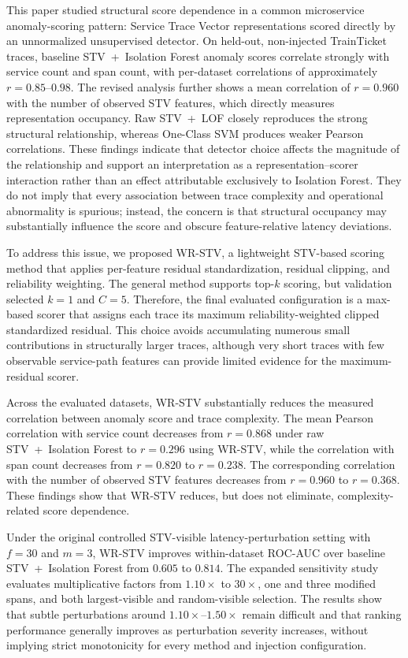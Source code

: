 \documentclass[informatics,article,submit,moreauthors]{Definitions/mdpi}
\newcommand{\rev}[1]{{\color{revisionblue}#1}}
\begin{document}
\rev{This paper studied structural score dependence in a common microservice anomaly-scoring pattern: Service Trace Vector representations scored directly by an unnormalized unsupervised detector. On held-out, non-injected TrainTicket traces, baseline STV~+~Isolation Forest anomaly scores correlate strongly with service count and span count, with per-dataset correlations of approximately \(r=0.85\)--\(0.98\). The revised analysis further shows a mean correlation of \(r=0.960\) with the number of observed STV features, which directly measures representation occupancy. Raw STV~+~LOF closely reproduces the strong structural relationship, whereas One-Class SVM produces weaker Pearson correlations. These findings indicate that detector choice affects the magnitude of the relationship and support an interpretation as a representation--scorer interaction rather than an effect attributable exclusively to Isolation Forest. They do not imply that every association between trace complexity and operational abnormality is spurious; instead, the concern is that structural occupancy may substantially influence the score and obscure feature-relative latency deviations.}

To address this issue, we proposed WR-STV, a lightweight STV-based scoring method that applies per-feature residual standardization, residual clipping, and reliability weighting. \rev{The general method supports top-\(k\) scoring, but validation selected \(k=1\) and \(C=5\). Therefore, the final evaluated configuration is a max-based scorer that assigns each trace its maximum reliability-weighted clipped standardized residual. This choice avoids accumulating numerous small contributions in structurally larger traces, although very short traces with few observable service-path features can provide limited evidence for the maximum-residual scorer.}

\rev{Across the evaluated datasets, WR-STV substantially reduces the measured correlation between anomaly score and trace complexity. The mean Pearson correlation with service count decreases from \(r=0.868\) under raw STV~+~Isolation Forest to \(r=0.296\) using WR-STV, while the correlation with span count decreases from \(r=0.820\) to \(r=0.238\). The corresponding correlation with the number of observed STV features decreases from \(r=0.960\) to \(r=0.368\). These findings show that WR-STV reduces, but does not eliminate, complexity-related score dependence.}

\rev{Under the original controlled STV-visible latency-perturbation setting with \(f=30\) and \(m=3\), WR-STV improves within-dataset ROC-AUC over baseline STV~+~Isolation Forest from \(0.605\) to \(0.814\). The expanded sensitivity study evaluates multiplicative factors from \(1.10\times\) to \(30\times\), one and three modified spans, and both largest-visible and random-visible selection. The results show that subtle perturbations around \(1.10\times\)--\(1.50\times\) remain difficult and that ranking performance generally improves as perturbation severity increases, without implying strict monotonicity for every method and injection configuration.}
\end{document}
